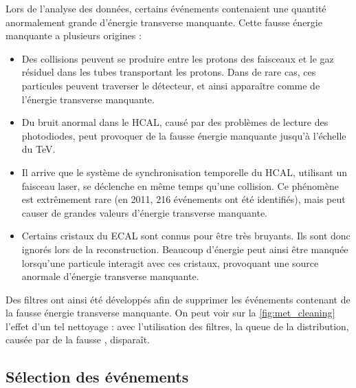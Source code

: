 Lors de l'analyse des données, certains événements contenaient une quantité anormalement grande d'énergie transverse manquante. Cette fausse énergie manquante a plusieurs origines :
\begin{itemize}
  \item Des collisions peuvent se produire entre les protons des faisceaux et le gaz résiduel dans les tubes transportant les protons. Dans de rare cas, ces particules peuvent traverser le détecteur, et ainsi apparaître comme de l'énergie transverse manquante.
  \item Du bruit anormal dans le HCAL, causé par des problèmes de lecture des photodiodes, peut provoquer de la fausse énergie manquante jusqu'à l'échelle du \si{\TeV}.
  \item Il arrive que le système de synchronisation temporelle du HCAL, utilisant un faisceau laser, se déclenche en même temps qu'une collision. Ce phénomène est extrêmement rare (en 2011, 216 événements ont été identifiés), mais peut causer de grandes valeurs d'énergie transverse manquante.
  \item Certains cristaux du ECAL sont connus pour être très bruyants. Ils sont donc ignorés lors de la reconstruction. Beaucoup d'énergie peut ainsi être manquée lorsqu'une particule interagit avec ces cristaux, provoquant une source anormale d'énergie transverse manquante.
\end{itemize}

Des filtres ont ainsi été développés afin de supprimer les événements contenant de la fausse énergie transverse manquante. On peut voir sur la \cref{fig:met_cleaning} l'effet d'un tel nettoyage : avec l'utilisation des filtres, la queue de la distribution, causée par de la fausse \met, disparaît.

\subsection{Sélection des événements}


